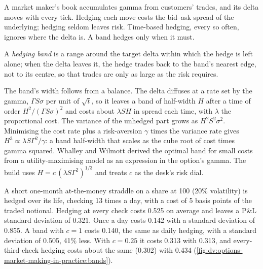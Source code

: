 A market maker's book accumulates gamma from customers' trades, and its delta moves with every tick. Hedging each move costs the bid--ask spread of
the underlying; hedging seldom leaves risk. Time-based hedging, every so often, ignores where the delta is. A band hedges only when it must.

\begin{definition}\label{def:dv:options-market-making-in-practice:band}
A \emph{hedging band} is a range around the target delta within which the hedge is left alone; when the delta leaves it, the
hedge trades back to the band's nearest edge, not to its centre, so that trades are only as large as the risk requires.
\end{definition}

The band's width follows from a balance. The delta diffuses at a rate set by the gamma, $\Gamma S\sigma$ per unit of $\sqrt t$, so it leaves a band of
half-width $H$ after a time of order $H^2/(\Gamma S\sigma)^2$ and costs about $\lambda SH$ in spread each time, with $\lambda$ the proportional cost.
The variance of the unhedged part grows as $H^2S^2\sigma^2$. Minimising the cost rate plus a risk-aversion $\gamma$ times the variance rate gives
$H^3\propto\lambda S\Gamma^2/\gamma$: a band half-width that scales as the cube root of cost times gamma squared. Whalley and Wilmott derived the optimal
band for small costs from a utility-maximising model as an expression in the option's gamma. The build uses $H=c\,(\lambda S\Gamma^2)^{1/3}$ and treats
$c$ as the desk's risk dial.

\begin{example}\label{ex:dv:options-market-making-in-practice:bands}
A short one-month at-the-money straddle on a share at 100 (20\% volatility) is hedged over its life, checking 13 times a day, with a cost of 5 basis points
of the traded notional. Hedging at every check costs 0.525 on average and leaves a P\&L standard deviation of 0.321. Once a day costs 0.142 with a standard
deviation of 0.855. A band with $c=1$ costs 0.140, the same as daily hedging, with a standard deviation of 0.505, 41\% less. With $c=0.25$ it costs 0.313
with 0.313, and every-third-check hedging costs about the same (0.302) with 0.434
(\cref{fig:dv:options-market-making-in-practice:bands}).
\end{example}

